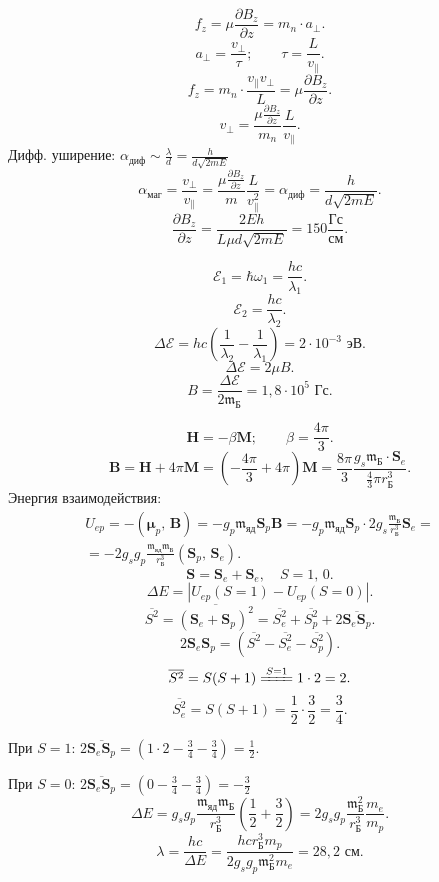 \documentclass[a4paper]{article}
\begin{document}
\[
f_z = \mu \frac{\partial B_z}{\partial z} = m_n \cdot a_\perp
.\] 
\[
a_\perp = \frac{v_\perp}{\tau};\qquad \tau = \frac{L}{v_{\parallel}}
.\] 
\[
f_z = m_n\cdot \frac{v_{\parallel}v_\perp}{L}= \mu \frac{\partial B_z}{\partial z} 
.\] 
\[
v_\perp= \frac{\mu \frac{\partial B_z}{\partial z} }{m_n} \frac{L}{v_{\parallel}}
.\] 
Дифф. уширение: $\alpha_\text{диф}\sim \frac{\lambda}{d}=\frac{h}{d
\sqrt{2 m E} }$ 
\[
\alpha_\text{маг}= \frac{v_\perp}{v_\parallel}= \frac{\mu \frac{\partial B_z}{\partial z} }{m} \frac{L}{v_\parallel^2}= \alpha_\text{диф}=
\frac{h}{d \sqrt{2 m E} }
.\] 
\[
\frac{\partial B_z}{\partial z} = \frac{2 E h}{L \mu d \sqrt{2mE} }=
150 \frac{\text{Гс}}{\text{см}}
.\] 
\begin{sol}
\[
	\mathcal{E}_1= \hbar \omega_1= \frac{hc}{\lambda_1}
.\] 
\[
	\mathcal{E}_2= \frac{hc}{\lambda_2}
.\] 
\[
	\Delta\mathcal{E}= hc \left( \frac{1}{\lambda_2}-\frac{1}{\lambda_1} \right) =2 \cdot 10^{-3} \text{ эВ}
.\] 
\[
	\Delta\mathcal{E}=2 \mu B
.\] 
\[
	B=\frac{\Delta\mathcal{E}}{2\mathfrak{m}_\text{Б}}=1,8 \cdot 10^5 \text{ Гс}
.\] 
\end{sol}
\begin{sol}
\[
\mathbf{H}=-\beta \mathbf{M};\qquad \beta= \frac{4\pi}{3}
.\] 
\[
	\mathbf{B}= \mathbf{H}+4 \pi \mathbf{M}=\left( 
	-\frac{4\pi}{3}+4\pi\right) \mathbf{M}=\frac{8\pi}{3} \frac{
g_s\mathfrak{m}_\text{Б}\cdot \mathbf{S}_e}{\frac{4}{3}\pi r_\text{Б}^3}
.\] 
Энергия взаимодействия:
\begin{multline*}
	U_{ep}= - \left( \boldsymbol{\mu}_p,\,\mathbf{B} \right)=
	-g_p \mathfrak{m}_\text{яд} \mathbf{S}_p \mathbf{B}=
	-g_p \mathfrak{m}_\text{яд} \mathbf{S}_p \cdot 2 g_s
	\frac{\mathfrak{m}_\text{Б}}{r_\text{Б}^3}\mathbf{S}_e=\\=
	- 2g_s g_p \frac{\mathfrak{m}_\text{яд}\mathfrak{m}_\text{Б}
	}{r_{\text{Б}}^3}(\mathbf{S}_p,\,\mathbf{S}_e)
.\end{multline*} 
\[
	\mathbf{S}=\mathbf{S}_e+\mathbf{S}_e,\quad S=1,\,0
.\] 
\[
	\Delta E=\left| U_{ep}(S=1)-U_{ep}(S=0) \right| 
.\] 
\[
	\overline{S^2}=\overline{\left( \mathbf{S}_e+\mathbf{S}_p \right) ^2}=\overline{S_e^2}+\overline{S_p^2}+2 \overline{\mathbf{S}_e
	\mathbf{S}_p}
.\] 
\[
	2\mathbf{S}_e\mathbf{S}_p=\left( \overline{S^2}-
	\overline{S^2_e}-\overline{S_p^2}\right) 
.\] 
\[
	\overline{S^2}= S(S+1) \xlongequal[]{S=1}1\cdot 2=2
.\] 
\[
	\overline{S_e^2}=S(S+1)=\frac{1}{2}\cdot \frac{3}{2}=\frac{3}{4}
.\]

При $S=1$: $2 \overline{\mathbf{S}_e \mathbf{S}_p}=\left(1\cdot 2-\frac{3}{4}-\frac{3}{4}\right)=\frac{1}{2}$.

При $S=0$: $2 \overline{\mathbf{S}_e \mathbf{S}_p}=\left( 0-
\frac{3}{4}-\frac{3}{4}\right) =-\frac{3}{2}$
\[
	\Delta E= g_s g_p \frac{\mathfrak{m}_\text{яд}\mathfrak{m}_\text{Б}}{r_{\text{Б}}^3}\left( \frac{1}{2}+\frac{3}{2} \right)=
	2 g_s g_p \frac{\mathfrak{m}_\text{Б}^2}{r_{\text{Б}}^3}
	\frac{m_e}{m_p}
.\] 
\[
\lambda= \frac{hc}{\Delta E}=\frac{hcr_\text{Б}^3 m_p}{2 g_s g_p
\mathfrak{m}_\text{Б}^2 m_e}= 28,2 \text{ см}
.\] 
\end{sol}
\end{document}
